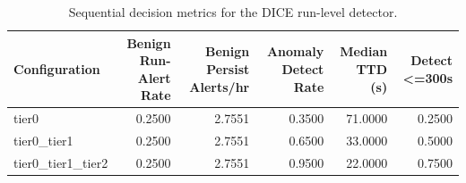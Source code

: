 \begin{table}[t]
\centering
\caption{Sequential decision metrics for the DICE run-level detector.}
\label{tab:dice_sequential_metrics}
\footnotesize
\begin{tabular}{lrrrrr}
\toprule
Configuration & Benign Run-Alert Rate & Benign Persist Alerts/hr & Anomaly Detect Rate & Median TTD (s) & Detect <=300s \\
\midrule
tier0 & 0.2500 & 2.7551 & 0.3500 & 71.0000 & 0.2500 \\
tier0_tier1 & 0.2500 & 2.7551 & 0.6500 & 33.0000 & 0.5000 \\
tier0_tier1_tier2 & 0.2500 & 2.7551 & 0.9500 & 22.0000 & 0.7500 \\
\bottomrule
\end{tabular}

\end{table}
